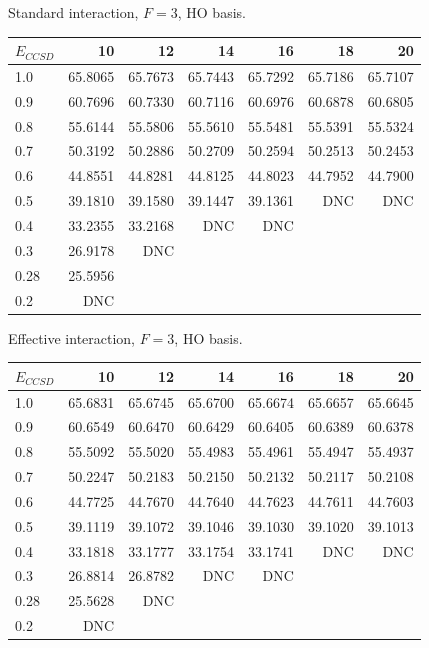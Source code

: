 \begin{table}
\begin{center}
Standard interaction, $F=3$, HO basis.\\
\begin{tabular}{l|rrrrrr}
\hline 
$E_{CCSD}$ & 10 & 12 & 14 & 16 & 18 & 20 \\
\hline \hline
1.0 & 65.8065 & 65.7673 & 65.7443 & 65.7292 & 65.7186 & 65.7107  \\ 
0.9 & 60.7696 & 60.7330 & 60.7116 & 60.6976 & 60.6878 & 60.6805  \\ 
0.8 & 55.6144 & 55.5806 & 55.5610 & 55.5481 & 55.5391 & 55.5324  \\ 
0.7 & 50.3192 & 50.2886 & 50.2709 & 50.2594 & 50.2513 & 50.2453  \\ 
0.6 & 44.8551 & 44.8281 & 44.8125 & 44.8023 & 44.7952 & 44.7900  \\ 
0.5 & 39.1810 & 39.1580 & 39.1447 & 39.1361 & DNC & DNC  \\ 
0.4 & 33.2355 & 33.2168 & DNC & DNC  \\ 
0.3 & 26.9178 & DNC  \\ 
0.28 & 25.5956  \\ 
0.2 & DNC  \\ 
\hline \hline
\end{tabular}
\end{center}
\end{table}

\begin{table}
\begin{center}
Effective interaction, $F=3$, HO basis.\\
\begin{tabular}{l|rrrrrr}
\hline 
$E_{CCSD}$ & 10 & 12 & 14 & 16 & 18 & 20 \\
\hline \hline
1.0 & 65.6831 & 65.6745 & 65.6700 & 65.6674 & 65.6657 & 65.6645  \\ 
0.9 & 60.6549 & 60.6470 & 60.6429 & 60.6405 & 60.6389 & 60.6378  \\ 
0.8 & 55.5092 & 55.5020 & 55.4983 & 55.4961 & 55.4947 & 55.4937  \\ 
0.7 & 50.2247 & 50.2183 & 50.2150 & 50.2132 & 50.2117 & 50.2108  \\ 
0.6 & 44.7725 & 44.7670 & 44.7640 & 44.7623 & 44.7611 & 44.7603  \\ 
0.5 & 39.1119 & 39.1072 & 39.1046 & 39.1030 & 39.1020 & 39.1013  \\ 
0.4 & 33.1818 & 33.1777 & 33.1754 & 33.1741 & DNC & DNC  \\ 
0.3 & 26.8814 & 26.8782 & DNC & DNC  \\ 
0.28 & 25.5628 & DNC  \\ 
0.2 & DNC  \\ 
\hline \hline
\end{tabular}
\end{center}
\end{table}

